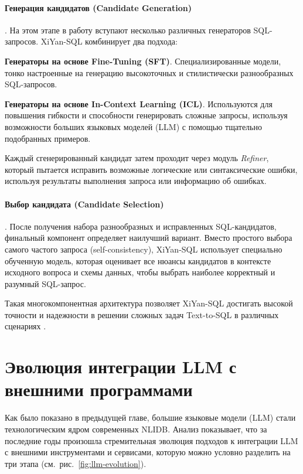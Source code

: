 \paragraph{Генерация кандидатов (Candidate Generation)}. На этом этапе в работу вступают
несколько различных генераторов SQL-запросов. XiYan-SQL комбинирует два подхода:
\begin{compactitem}
	\item \textbf{Генераторы на основе Fine-Tuning (SFT)}. Специализированные модели,
	тонко настроенные на генерацию высокоточных и стилистически разнообразных SQL-запросов.
	\item \textbf{Генераторы на основе In-Context Learning (ICL)}. Используются для
	повышения гибкости и способности генерировать сложные запросы,
	используя возможности больших языковых моделей (LLM) с помощью тщательно подобранных примеров.
\end{compactitem}
Каждый сгенерированный кандидат затем проходит через модуль \textit{Refiner},
который пытается исправить возможные логические или синтаксические ошибки,
используя результаты выполнения запроса или информацию об ошибках.

\paragraph{Выбор кандидата (Candidate Selection)}. После получения набора разнообразных и
исправленных SQL-кандидатов, финальный компонент определяет наилучший вариант.
Вместо простого выбора самого частого запроса (self-consistency),
XiYan-SQL использует специально обученную модель, которая оценивает все нюансы кандидатов в
контексте исходного вопроса и схемы данных, чтобы выбрать наиболее корректный и разумный SQL-запрос.

Такая многокомпонентная архитектура позволяет XiYan-SQL достигать высокой точности и надежности в решении сложных задач Text-to-SQL в различных сценариях \cite{gaoPreviewXiYanSQLMultiGenerator2025}.




\section{Эволюция интеграции LLM с внешними программами}

Как было показано в предыдущей главе, большие языковые модели (LLM) стали технологическим ядром
современных NLIDB. Анализ показывает, что за последние годы произошла стремительная эволюция подходов
к интеграции LLM с внешними инструментами и сервисами, которую можно условно разделить на три этапа
(см.~рис.~\ref{fig:llm-evolution}).


